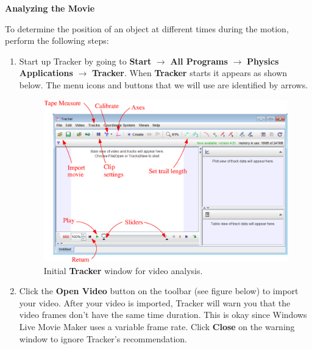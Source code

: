 \textbf{Analyzing the Movie} 

To determine the position of an object at different times during the
motion, perform the following steps:

\begin{enumerate}

\item Start up Tracker by going to {\bf Start} $\rightarrow$ {\bf All Programs} $\rightarrow$ 
{\bf Physics Applications} $\rightarrow$ {\bf Tracker}. 
When {\bf Tracker} starts it appears as shown below. The menu icons and buttons that we will use are identified by arrows.
\begin{figure}[hbt]
\begin{center}
\includegraphics[width=5.5in]{video_analysis_tracker_fig1d.eps}
\caption{Initial {\bf Tracker} window for video analysis.}
\end{center}
\end{figure}

\item Click the {\bf Open Video} button on the toolbar (see figure below) to import your video. 
After your video is imported, Tracker will warn you that the video frames don't have the same time duration. 
This is okay since Windows Live Movie Maker uses a variable frame rate. 
Click {\bf Close} on the warning window to ignore Tracker's recommendation.


\end{enumerate}
